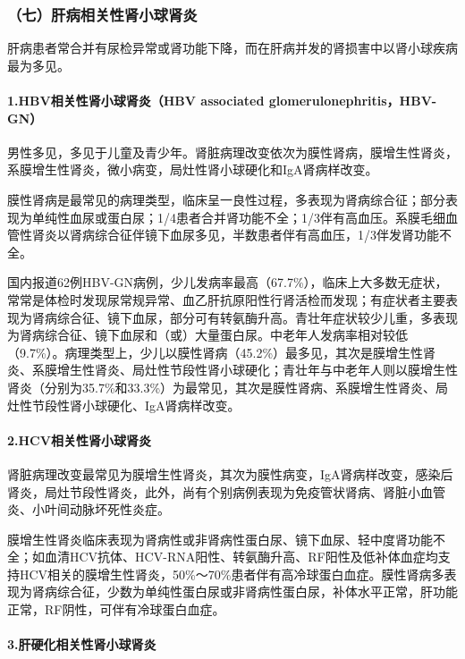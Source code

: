 \subsubsection{（七）肝病相关性肾小球肾炎}

肝病患者常合并有尿检异常或肾功能下降，而在肝病并发的肾损害中以肾小球疾病最为多见。

\paragraph{1.HBV相关性肾小球肾炎（HBV associated glomerulonephritis，HBV-GN）}

男性多见，多见于儿童及青少年。肾脏病理改变依次为膜性肾病，膜增生性肾炎，系膜增生性肾炎，微小病变，局灶性肾小球硬化和IgA肾病样改变。

膜性肾病是最常见的病理类型，临床呈一良性过程，多表现为肾病综合征；部分表现为单纯性血尿或蛋白尿；1/4患者合并肾功能不全；1/3伴有高血压。系膜毛细血管性肾炎以肾病综合征伴镜下血尿多见，半数患者伴有高血压，1/3伴发肾功能不全。

国内报道62例HBV-GN病例，少儿发病率最高（67.7\%），临床上大多数无症状，常常是体检时发现尿常规异常、血乙肝抗原阳性行肾活检而发现；有症状者主要表现为肾病综合征、镜下血尿，部分可有转氨酶升高。青壮年症状较少儿重，多表现为肾病综合征、镜下血尿和（或）大量蛋白尿。中老年人发病率相对较低（9.7\%）。病理类型上，少儿以膜性肾病（45.2\%）最多见，其次是膜增生性肾炎、系膜增生性肾炎、局灶性节段性肾小球硬化；青壮年与中老年人则以膜增生性肾炎（分别为35.7\%和33.3\%）为最常见，其次是膜性肾病、系膜增生性肾炎、局灶性节段性肾小球硬化、IgA肾病样改变。

\paragraph{2.HCV相关性肾小球肾炎}

肾脏病理改变最常见为膜增生性肾炎，其次为膜性病变，IgA肾病样改变，感染后肾炎，局灶节段性肾炎，此外，尚有个别病例表现为免疫管状肾病、肾脏小血管炎、小叶间动脉坏死性炎症。

膜增生性肾炎临床表现为肾病性或非肾病性蛋白尿、镜下血尿、轻中度肾功能不全；如血清HCV抗体、HCV-RNA阳性、转氨酶升高、RF阳性及低补体血症均支持HCV相关的膜增生性肾炎，50\%～70\%患者伴有高冷球蛋白血症。膜性肾病多表现为肾病综合征，少数为单纯性蛋白尿或非肾病性蛋白尿，补体水平正常，肝功能正常，RF阴性，可伴有冷球蛋白血症。

\paragraph{3.肝硬化相关性肾小球肾炎}


